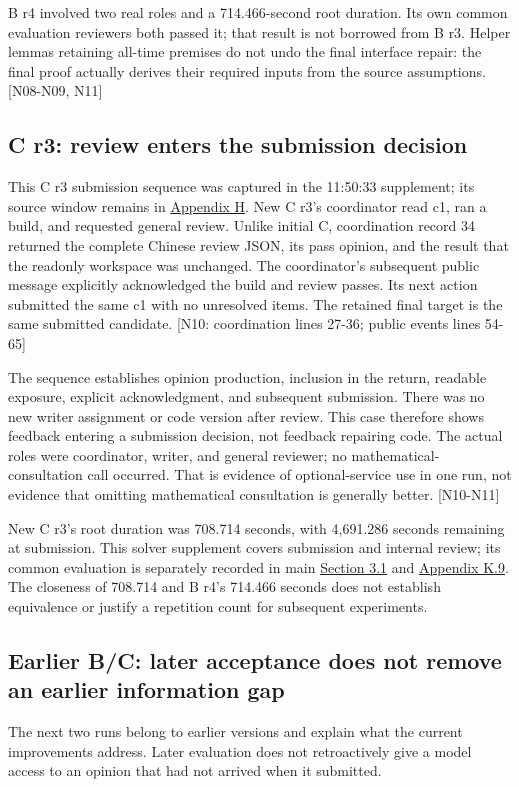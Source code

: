 B r4 involved two real roles and a 714.466-second root duration. Its own common evaluation reviewers both passed it; that result is not borrowed from B r3. Helper lemmas retaining all-time premises do not undo the final interface repair: the final proof actually derives their required inputs from the source assumptions. [N08-N09, N11]

\subsection[C r3: review enters the submission decision]{\texorpdfstring{\protect\hypertarget{g8}{}C r3: review enters the submission decision}{C r3: review enters the submission decision}}
This C r3 submission sequence was captured in the 11:50:33 supplement; its source window remains in \hyperlink{appendix-h}{Appendix H}. New C r3's coordinator read c1, ran a build, and requested general review. Unlike initial C, coordination record 34 returned the complete Chinese review JSON, its pass opinion, and the result that the readonly workspace was unchanged. The coordinator's subsequent public message explicitly acknowledged the build and review passes. Its next action submitted the same c1 with no unresolved items. The retained final target is the same submitted candidate. [N10: coordination lines 27-36; public events lines 54-65]

The sequence establishes opinion production, inclusion in the return, readable exposure, explicit acknowledgment, and subsequent submission. There was no new writer assignment or code version after review. This case therefore shows feedback entering a submission decision, not feedback repairing code. The actual roles were coordinator, writer, and general reviewer; no mathematical-consultation call occurred. That is evidence of optional-service use in one run, not evidence that omitting mathematical consultation is generally better. [N10-N11]

New C r3's root duration was 708.714 seconds, with 4,691.286 seconds remaining at submission. This solver supplement covers submission and internal review; its common evaluation is separately recorded in main \href{en.pdf\#section-3-1}{Section 3.1} and \hyperlink{k9}{Appendix K.9}. The closeness of 708.714 and B r4's 714.466 seconds does not establish equivalence or justify a repetition count for subsequent experiments.

\subsection[Earlier B/C: later acceptance does not remove an earlier information gap]{\texorpdfstring{\protect\hypertarget{g9}{}Earlier B/C: later acceptance does not remove an earlier information gap}{Earlier B/C: later acceptance does not remove an earlier information gap}}
The next two runs belong to earlier versions and explain what the current improvements address. Later evaluation does not retroactively give a model access to an opinion that had not arrived when it submitted.

